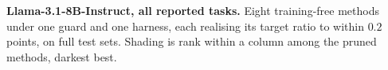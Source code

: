 \begin{table}[t]
\centering
\caption{\textbf{Llama-3.1-8B-Instruct, all reported tasks.} Eight training-free methods under one
guard and one harness, each realising its target ratio to within $0.2$ points, on full test sets.
Shading is rank within a column among the pruned methods, darkest best.}
\label{tab:headline}
\resizebox{\textwidth}{!}{}
\end{table}
